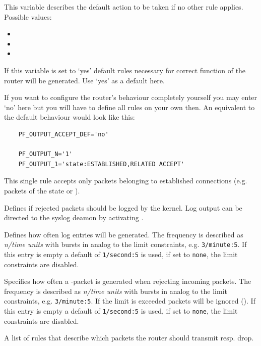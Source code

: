 \begin{description}
This variable describes the default action to be taken if no other
rule applies. Possible values:

\begin{itemize}
\item {}
\item {}
\item {}
\end{itemize}

If this variable is set to `yes' default rules necessary for correct function of
the router will be generated. Use `yes' as a default here.

If you want to configure the router's behaviour completely yourself you may
enter `no' here but you will have to define all rules on your own then.
An equivalent to the default behaviour would look like this:

\begin{example}
{\footnotesize
\begin{verbatim}
    PF_OUTPUT_ACCEPT_DEF='no'

    PF_OUTPUT_N='1'
    PF_OUTPUT_1='state:ESTABLISHED,RELATED ACCEPT'
\end{verbatim}}
\end{example}

This single rule accepts only packets belonging to established connections
(e.g. packets of the state  or ).

Defines if rejected packets should be logged by the kernel.
Log output can be directed to the syslog deamon by activating .

Defines how often log entries will be generated. The frequency is described
as \emph{n/time units} with bursts in analog to the limit constraints, e.g.
\texttt{3/minute:5}. If this entry is empty a default of \texttt{1/second:5}
is used, if set to \texttt{none}, the limit constraints are disabled.

Specifies how often a -packet is generated when rejecting
incoming packets. The frequency is described as \emph{n/time units} with bursts 
in analog to the limit constraints, e.g. \texttt{3/minute:5}. If the limit is
exceeded packets will be ignored (). If this entry is
empty a default of \texttt{1/second:5} is used, if set to \texttt{none},
the limit constraints are disabled.

A list of rules that describe which packets the router should transmit resp. drop.
\end{description}

